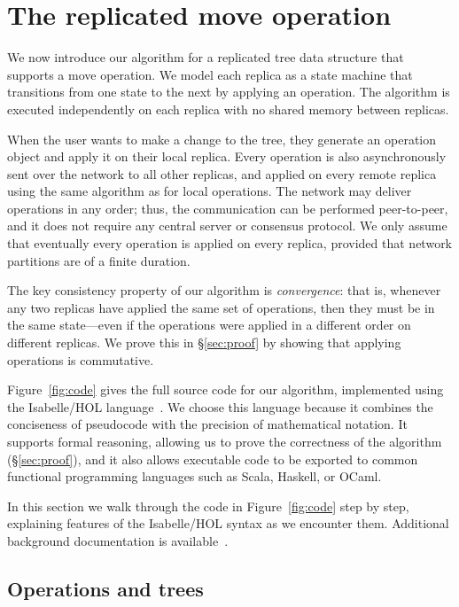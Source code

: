 \documentclass[sigplan,anonymous]{acmart}
\begin{document}
\section{The replicated move operation}\label{sec:algorithm}

We now introduce our algorithm for a replicated tree data structure that supports a move operation.
We model each replica as a state machine that transitions from one state to the next by applying an operation.
The algorithm is executed independently on each replica with no shared memory between replicas.

When the user wants to make a change to the tree, they generate an operation object and apply it on their local replica.
Every operation is also asynchronously sent over the network to all other replicas, and applied on every remote replica using the same algorithm as for local operations.
The network may deliver operations in any order; thus, the communication can be performed peer-to-peer, and it does not require any central server or consensus protocol.
We only assume that eventually every operation is applied on every replica, provided that network partitions are of a finite duration.

The key consistency property of our algorithm is \emph{convergence}: that is, whenever any two replicas have applied the same set of operations, then they must be in the same state---even if the operations were applied in a different order on different replicas.
We prove this in \S\ref{sec:proof} by showing that applying operations is commutative.

Figure~\ref{fig:code} gives the full source code for our algorithm, implemented using the Isabelle/HOL language~\cite{DBLP:conf/tphol/WenzelPN08}.
We choose this language because it combines the conciseness of pseudocode with the precision of mathematical notation.
It supports formal reasoning, allowing us to prove the correctness of the algorithm (\S\ref{sec:proof}), and it also allows executable code to be exported to common functional programming languages such as Scala, Haskell, or OCaml.

In this section we walk through the code in Figure~\ref{fig:code} step by step, explaining features of the Isabelle/HOL syntax as we encounter them.
Additional background documentation is available~\cite{DBLP:books/sp/NipkowK14}.

\subsection{Operations and trees}\label{sec:ops-trees}
\end{document}
